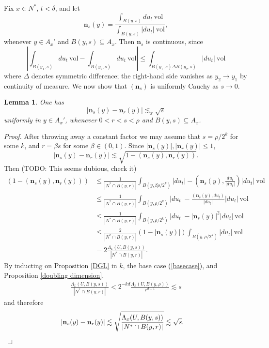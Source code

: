 \documentclass[reqno,12pt,letterpaper]{amsart}
\newcommand{\normal}{\mathbf n}
\newcommand{\vol}{\mathrm{vol}}
\newtheorem{lemma}[theorem]{Lemma}
\theoremstyle{definition}
\numberwithin{equation}{section}
\begin{document}
Fix $x \in N^*$, $t < \delta$, and let
$$\normal_s(y) = \frac{\int_{B(y, s)} du_t ~\vol}{\int_{B(y, s)} |du_t| ~\vol},$$
whenever $y \in A_x'$ and $B(y, s) \subseteq A_x$.
Then $\normal_s$ is continuous, since
$$\left|\int_{B(y_1, s)} du_t ~\vol - \int_{B(y_2, s)} du_t ~\vol\right| \leq \int_{B(y_1, s) \Delta B(y_2, s)} |du_t| ~\vol$$
where $\Delta$ denotes symmetric difference; the right-hand side vanishes as $y_2 \to y_1$ by continuity of measure.
We now show that $(\normal_s)$ is uniformly Cauchy as $s \to 0$.

\begin{lemma}
One has
$$|\normal_s(y) - \normal_r(y)| \lesssim_x \sqrt s$$
uniformly in $y \in A_x'$, whenever $0 < r < s < \rho$ and $B(y, s) \subseteq A_x$.
\end{lemma}
\begin{proof}
After throwing away a constant factor we may assume that $s = \rho/2^k$ for some $k$, and $r = \beta s$ for some $\beta \in (0, 1)$.
Since $|\normal_s(y)|,|\normal_r(y)| \leq 1$,
$$|\normal_s(y) - \normal_r(y)| \lesssim \sqrt{1 - (\normal_s(y), \normal_r(y))}.$$
Then (TODO: This seems dubious, check it)
\begin{align*}
(1 - (\normal_s(y), \normal_r(y)))  &\leq \frac{1}{|N^* \cap B(y, r)|} \int_{B(y, \beta \rho/2^k)} |du_t| - \left(\normal_s(y), \frac{du_t}{|du_t|}\right) |du_t| ~\vol\\
&\leq \frac{1}{|N^* \cap B(y, r)|} \int_{B(y, \rho/2^k)} |du_t| - \frac{(\normal_s(y), du_t)}{|du_t|} |du_t| ~\vol \\
&\leq \frac{1}{|N^* \cap B(y, r)|} \int_{B(y, \rho/2^k)} |du_t| - |\normal_s(y)|^2 |du_t| ~\vol\\
&\leq \frac{2}{|N^* \cap B(y, r)|} (1 - |\normal_s(y)|)\int_{B(y, \rho/2^k)} |du_t| ~\vol\\
&= 2\frac{\Lambda_x(U, B(y, s))}{|N^* \cap B(y, r)|}.
\end{align*}
By inducting on Proposition \ref{DGL} in $k$, the base case (\ref{basecase}), and Proposition \ref{doubling dimension},
\begin{align*}
\frac{\Lambda_x(U, B(y, s))}{|N^* \cap B(y, r)|} < 2^{-kd} \frac{\Lambda_x(U, B(y, \rho))}{r^{d - 1}} \lesssim s
\end{align*}
and therefore
\begin{align*}
|\normal_s(y) - \normal_r(y)| &\lesssim \sqrt{\frac{\Lambda_x(U, B(y, s))}{|N^* \cap B(y, r)|}} \lesssim \sqrt s. \qedhere
\end{align*}
\end{proof}
\end{document}
